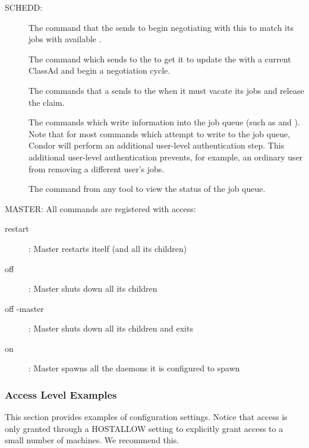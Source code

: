 SCHEDD: 

\begin{description}
\item[]
The command that the  sends to
  begin negotiating with this  to match its jobs with available
  .

\item[]
The command which  sends to
  the  to get it to update the  with a current ClassAd
  and begin a negotiation cycle.

  The commands that a  sends to the  when it must vacate
  its jobs and release the  claim.

  The commands which write information into the job queue (such as
   and ).  
  Note that for most commands which attempt to write to the job queue, Condor
  will perform an additional user-level authentication step.  
  This additional user-level authentication prevents, for example, an
  ordinary user from removing a different user's jobs.

\item[]
The command from any
  tool to view the status of the job queue.  
\end{description}

MASTER:  All commands are registered with 
access:

\begin{description}
\item[restart] : Master restarts itself (and all its children)	
\item[off] : Master shuts down all its children
\item[off -master] : Master shuts down all its children and exits
\item[on] : Master spawns all the daemons it is configured to spawn
\end{description}


\subsubsection{\label{sec:DCPerm-Examples}Access Level Examples}

This section provides examples of configuration settings.
Notice that  access is
only granted through a HOSTALLOW setting to explicitly grant access to
a small number of machines.  We recommend this.


